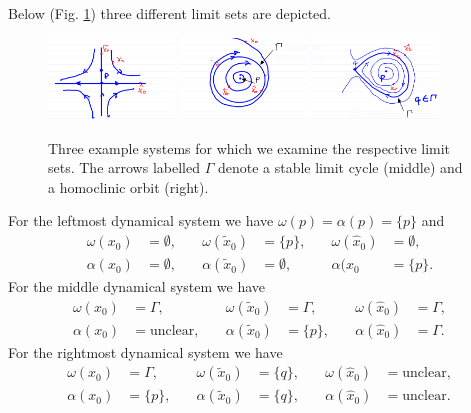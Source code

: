 \begin{ex}
	Below (Fig. \ref{fig:limset_ex}) three different limit sets are depicted.
	\begin{figure}[h!]
		\centering
		\includegraphics[width=0.3\textwidth]{figures/ch4/6limset_ex_1.png}
		\includegraphics[width=0.3\textwidth]{figures/ch4/6limset_ex_2.png}
		\includegraphics[width=0.3\textwidth]{figures/ch4/6limset_ex_3.png}
		\caption{Three example systems for which we examine the respective limit sets. The arrows labelled $\Gamma $ denote a stable limit cycle (middle) and a homoclinic orbit (right).}
		\label{fig:limset_ex}
	\end{figure}
	For the leftmost dynamical system we have $\omega(p)=\alpha(p)=\{p\}$ and
\begin{align}
	\omega(x_0) &= \emptyset, \quad &\omega(\tilde{x}_0) &= \{p\}, \quad &{\omega }(\hat{x}_0)&= \emptyset, \\
	\alpha(x_0)&=\emptyset, \quad & \alpha(\tilde{x}_0)&=\emptyset,\quad &\alpha(\hat{x}_0&=\{p\}.
\end{align}
	For the middle dynamical system we have 
\begin{align}
	\omega(x_0) &= \Gamma, \quad &\omega(\tilde{x}_0) &= \Gamma, \quad &{\omega }(\hat{x}_0)&= \Gamma, \\
	\alpha(x_0)&= \textrm{unclear} , \quad & \alpha(\tilde{x}_0)&=\{p\},\quad &\alpha(\hat{x}_0)&=\Gamma.
\end{align}
	For the rightmost dynamical system we have 
\begin{align}
	\omega(x_0) &= \Gamma, \quad &\omega(\tilde{x}_0) &= \{q\}, \quad &{\omega }(\hat{x}_0)&=  \textrm{unclear}, \\
	\alpha(x_0)&= \{p\} , \quad & \alpha(\tilde{x}_0)&=\{q\},\quad &\alpha(\hat{x}_0)&= \textrm{unclear} .
\end{align}
\end{ex}

